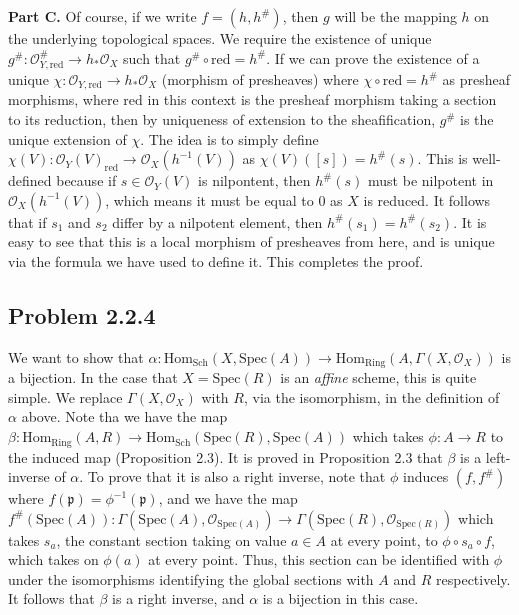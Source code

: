 \documentclass[aps,pra,showpacs,notitlepage,onecolumn,superscriptaddress,nofootinbib]{revtex4-1}
\theoremstyle{definition}
\begin{document}
\noindent \textbf{Part C.} Of course, if we write $f = (h, h^{\#})$, then $g$ will be the mapping $h$ on the underlying topological spaces.
We require the existence of unique $g^{\#} : \mathcal{O}_{Y, \text{red}}^{\#} \rightarrow h_{*} \mathcal{O}_X$
          such that $g^{\#} \circ \text{red} = h^{\#}$. If we can prove the existence of a unique $\chi : \mathcal{O}_{Y, \text{red}} \rightarrow h_{*} \mathcal{O}_X$ (morphism of presheaves) where $\chi \circ \text{red} = h^{\#}$ as
          presheaf morphisms, where $\text{red}$ in this context is the presheaf morphism taking a section to its reduction, then by uniqueness of extension to the sheafification, $g^{\#}$ is the unique extension of $\chi$.
          The idea is to simply define $\chi(V) : \mathcal{O}_Y(V)_{\text{red}} \rightarrow \mathcal{O}_X(h^{-1}(V))$ as $\chi(V)([s]) = h^{\#}(s)$. This is well-defined because if $s \in \mathcal{O}_Y(V)$ is nilpontent, then
          $h^{\#}(s)$ must be nilpotent in $\mathcal{O}_X(h^{-1}(V))$, which means it must be equal to $0$ as $X$ is reduced. It follows that if $s_1$ and $s_2$ differ by a nilpotent element, then $h^{\#}(s_1) = h^{\#}(s_2)$.
          It is easy to see that this is a local morphism of presheaves from here, and is unique via the formula we have used to define it. This completes the proof.

 \subsection{Problem 2.2.4}

 \noindent We want to show that $\alpha : \text{Hom}_{\text{Sch}}(X, \text{Spec}(A)) \rightarrow \text{Hom}_{\text{Ring}}(A, \Gamma(X, \mathcal{O}_X))$ is a bijection. In the case that $X = \text{Spec}(R)$ is an \emph{affine} scheme,
  this is quite simple. We replace $\Gamma(X, \mathcal{O}_X)$ with $R$, via the isomorphism, in the definition of $\alpha$ above.
  Note tha we have the map $\beta : \text{Hom}_{\text{Ring}}(A, R) \rightarrow \text{Hom}_{\text{Sch}}(\text{Spec}(R), \text{Spec}(A))$ which takes $\phi : A \rightarrow R$ to the induced map (Proposition 2.3). It is proved in
  Proposition 2.3 that $\beta$ is a left-inverse of $\alpha$. To prove that it is also a right inverse, note that $\phi$ induces $(f, f^{\#})$ where $f(\mathfrak{p}) = \phi^{-1}(\mathfrak{p})$, and we have
  the map $f^{\#}(\text{Spec}(A)) : \Gamma(\text{Spec}(A), \mathcal{O}_{\text{Spec}(A)}) \rightarrow \Gamma(\text{Spec}(R), \mathcal{O}_{\text{Spec}(R)})$ which takes $s_a$, the constant
  section taking on value $a \in A$ at every point, to $\phi \circ s_a \circ f$, which takes on $\phi(a)$ at every point. Thus, this section can be identified with $\phi$ under the isomorphisms identifying the
  global sections with $A$ and $R$ respectively. It follows that $\beta$ is a right inverse, and $\alpha$ is a bijection in this case.
\end{document}
